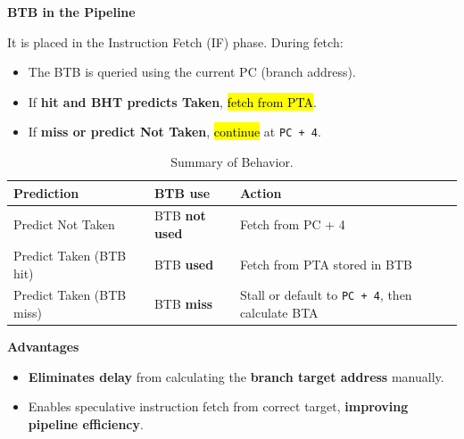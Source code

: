 \highspace
\begin{flushleft}
    \textcolor{Green3}{ \textbf{BTB in the Pipeline}}
\end{flushleft}
It is placed in the Instruction Fetch (IF) phase. During fetch:
\begin{itemize}
    \item The BTB is queried using the current PC (branch address).
    \item If \textbf{hit and BHT predicts Taken}, \hl{fetch from PTA}.
    \item If \textbf{miss or predict Not Taken}, \hl{continue} at \texttt{PC + 4}.
\end{itemize}

\begin{table}[!htp]
    \centering
    \begin{adjustbox}{width={\textwidth},totalheight={\textheight},keepaspectratio}
        \begin{tabular}{@{} l | l | l @{}}
            \toprule
            \textbf{Prediction} & \textbf{BTB use} & \textbf{Action} \\
            \midrule
            Predict Not Taken         & BTB \textbf{not used}  & Fetch from PC + 4                                       \\ [.5em]
            Predict Taken (BTB hit)   & BTB \textbf{used}      & Fetch from PTA stored in BTB                            \\ [.5em]
            Predict Taken (BTB miss)  & BTB \textbf{miss}      & Stall or default to \texttt{PC + 4}, then calculate BTA \\
            \bottomrule
        \end{tabular}
    \end{adjustbox}
    \caption{Summary of Behavior.}
\end{table}

\begin{flushleft}
    \textcolor{Green3}{ \textbf{Advantages}}
\end{flushleft}
\begin{itemize}[label=\textcolor{Green3}{}]
    \item \textbf{Eliminates delay} from calculating the \textbf{branch target address} manually.
    \item Enables speculative instruction fetch from correct target, \textbf{improving pipeline efficiency}.
\end{itemize}